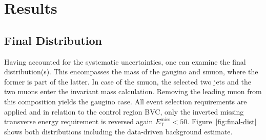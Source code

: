 \chapter{Results}
\label{cha:results}

\section{Final Distribution}
\label{sec:final-dist}

Having accounted for the systematic uncertainties, one can examine the final distribution(s). This encompasses the mass of the gaugino and smuon, where the former is part of the latter. In case of the smuon, the selected two jets and the two muons enter the invariant mass calculation. Removing the leading muon from this composition yields the gaugino case. All event selection requirements are applied and in relation to the control region BVC, only the inverted missing transverse energy requirement is reversed again $E_{\text{T}}^{\text{miss}} < 50$. Figure~\ref{fig:final-dist} shows both distributions including the data-driven background estimate.

